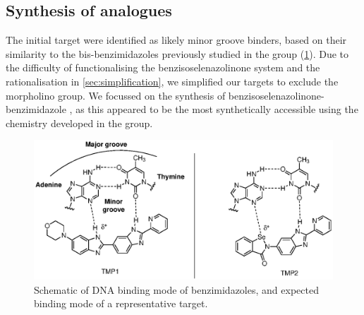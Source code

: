 \begin{refsection}
\section{Synthesis of analogues}
The initial target  were identified as likely minor groove binders, based on their similarity to the bis-benzimidazoles previously studied in the group (\cref{fig:dna-binding}).
Due to the difficulty of functionalising the benzisoselenazolinone system and the rationalisation in \cref{sec:simplification}, we simplified our targets to exclude the morpholino group.
We focussed on the synthesis of benzisoselenazolinone-benzimidazole , as this appeared to be the most synthetically accessible using the chemistry developed in the group.

\begin{figure}
    \centering
    \includegraphics[scale=0.74]{Figures/dna-binding.eps}
    \caption{Schematic of DNA binding mode of benzimidazoles, and expected binding mode of a representative target.}\label{fig:dna-binding}
\end{figure}

\end{refsection}

